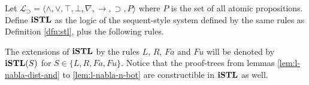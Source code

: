 \begin{dfn}\label{dfn:istl}
	Let $\mathcal{L}_\supset=\langle \wedge, \vee, \top, \bot, \nabla, \rightarrow, \supset, P \rangle$ where $P$ is the set of all atomic propositions. Define $\istl$ as the logic of the sequent-style system defined by the same rules as Definition \ref{dfn:stl}, plus the following rules.
\end{dfn}
\begin{multicols}{2}
  \begin{prooftree}
  \end{prooftree}
  \columnbreak
  \begin{prooftree}
  \end{prooftree}
\end{multicols}
The extensions of $\istl$ by the rules $L$, $R$, $Fa$ and $Fu$ will be denoted by $\istl(S)$ for $S \in \{ L, R, Fa, Fu \}$. Notice that the proof-trees from lemmas \ref{lem:l-nabla-dist-and} to \ref{lem:l-nabla-n-bot} are constructible in $\istl$ as well.